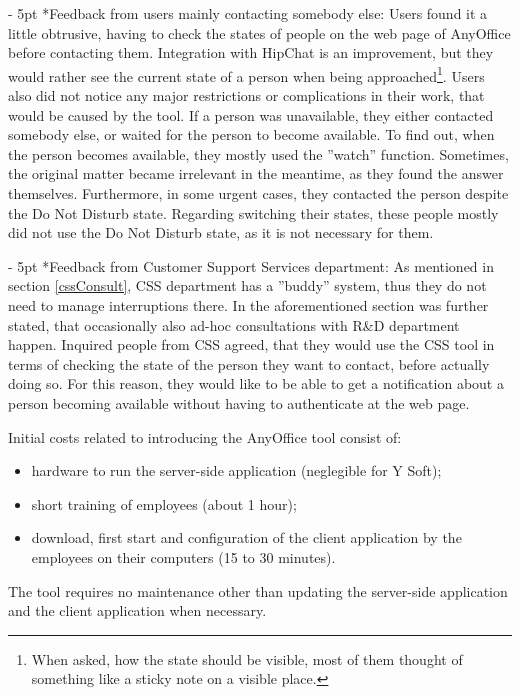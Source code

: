 \documentclass[11pt,singleside]{myfithesis2}
\makeatletter
\renewcommand\paragraph{
   \vspace{-10pt}
   \@startsection{paragraph}{4}{0mm}
      {\baselineskip}
      {- 5pt}
      {\normalfont\normalsize\bfseries}
}
\makeatother
\begin{document}
\paragraph*{Feedback from users mainly contacting somebody else: } Users found it a little obtrusive, having to check the states of people on the web page of AnyOffice before contacting them. Integration with HipChat is an improvement, but they would rather see the current state of a person when being approached\footnote{When asked, how the state should be visible, most of them thought of something like a sticky note on a visible place.}. Users also did not notice any major restrictions or complications in their work, that would be caused by the tool. If a person was unavailable, they either contacted somebody else, or waited for the person to become available. To find out, when the person becomes available, they mostly used the ''watch'' function. Sometimes, the original matter became irrelevant in the meantime, as they found the answer themselves. Furthermore, in some urgent cases, they contacted the person despite the Do Not Disturb state. Regarding switching their states, these people mostly did not use the Do Not Disturb state, as it is not necessary for them.

\paragraph*{Feedback from Customer Support Services department: } As mentioned in section \ref{cssConsult}, CSS department has a ''buddy'' system, thus they do not need to manage interruptions there. In the aforementioned section was further stated, that occasionally also ad-hoc consultations with R\&D department happen. Inquired people from CSS agreed, that they would use the CSS tool in terms of checking the state of the person they want to contact, before actually doing so. For this reason, they would like to be able to get a notification about a person becoming available without having to authenticate at the web page.

Initial costs related to introducing the AnyOffice tool consist of:
\begin{itemize}
	\item{hardware to run the server-side application (neglegible for Y Soft);}
	\item{short training of employees (about 1 hour);}
	\item{download, first start and configuration of the client application by the employees on their computers (15 to 30 minutes).}
\end{itemize}
The tool requires no maintenance other than updating the server-side application and the client application when necessary. 
\end{document}
